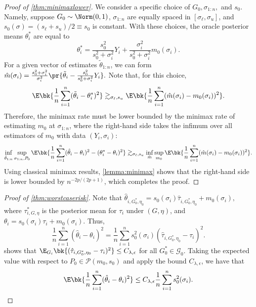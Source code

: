 \documentclass[12pt, reqno]{amsart}
\newif\ifrepeatthm
\newcommand{\sigl}{\sigma_\ell}
\newcommand{\sigu}{\sigma_u}
\newcommand{\hatm}{\hat m}
\numberwithin{equation}{section}
\begin{document}
\begin{appendices}
\begin{proof}[Proof of \cref{thm:minimaxlower}]
We consider a specific choice of $G_0, \sigma_{1:n},$ and $s_0$. Namely, suppose $G_0
\sim \Norm(0,1)$, $\sigma_{1:n}$ are equally spaced in $[\sigl, \sigu]$, and $s_0(\sigma)
= (s_\ell + s_u) / 2 \equiv s_0$ is constant.  With these choices, the oracle posterior
means $\theta_i^*$ are equal to \[
\theta_i^* = \frac{s_0^2}{s_0^2 + \sigma_i^2} Y_i + \frac{\sigma_i^2}{s_0^2 + \sigma_i^2}
m_0(\sigma_i).
\]
For a given vector of estimates $\tilde \theta_{1:n}$, we can form $
\hatm(\sigma_i) = \frac{s_0^2 + \sigma_i^2}{\sigma_i^2} \pr{\tilde \theta_i -
\frac{s_0^2}{s_0^2 + \sigma_i^2} Y_i}.$ Note that, for this choice, \[
\E\bk{\frac{1}{n} \sum_{i=1}^n (\tilde \theta_i - \theta_i^*)^2} 
\gtrsim_{\sigl, s_u} \E
\bk{\frac{1}{n} \sum_{i=1}^n (\hat m(\sigma_i) - m_0(\sigma_i))^2}.
\]
Therefore, the minimax rate must be lower bounded by the minimax rate of estimating $m_0$
at $\sigma_{1:n}$, where the right-hand side takes the infimum over all estimators of
$m_0$ with data $(Y_i, \sigma_i)$: \[
\inf_{\hat\theta_{1:n}} \sup_{\sigma_{1:n}, P_0} \E\bk{
    \frac{1}{n} \sum_{i=1}^n (\hat\theta_i - \theta_i)^2 - (\theta_i^* - \theta_i)^2
} \gtrsim_{\sigl, s_u} \inf_{\hatm} \sup_{m_0}  \E\bk{\frac{1}{n} \sum_{i=1}^n (\hat
m(\sigma_i) - m_0 (\sigma_i))^2}.
\]
Using classical minimax results, \cref{lemma:minimax} shows that the right-hand side is
lower bounded by $n^ {-2p/ (2p+1)}$, which completes the proof.
\end{proof}




\ifrepeatthm\worstcaserisk*\fi


\begin{proof}[Proof of \cref{thm:worstcaserisk}]
Note that $\hat\theta_{i, G_0^*, \eta_0} =
s_0(\sigma_i)
\hat\tau_{i, G_0^*, \eta_0} + m_0(\sigma_i),$ where $\tau^*_{i,G,\eta}$ is the posterior
mean for $\tau_i$ under $(G,\eta)$, and $
\theta_i = s_0(\sigma_i) \tau_i + m_0(\sigma_i).
$ Thus, \[
\frac{1}{n}\sum_{i=1}^n (\hat\theta_i - \theta_i)^2 = \frac{1}{n}\sum_{i=1}^n s_0^2
(\sigma_i) (\hat\tau_{i, G_0^*,
\eta_0} - \tau_i)^2.
\]
 shows that $
\E_{G_i} \bk{
  (\hat\tau_{i, G_0^*, \eta_0} - \tau_i)^2
} \le C_{\lambda, \epsilon}$ for all $G_0^* \in \mathcal G_0$.  
Taking the expected value with respect to $P_0 \in \mathcal P(m_0, s_0)$ and apply the
bound $C_{\lambda, \epsilon}$, we have that \[
\E\bk{\frac{1}{n}\sum_{i=1}^n (\hat\theta_i - \theta_i)^2} \le 
C_{\lambda, \epsilon}
\frac{1}{n}\sum_{i=1}^n s_0^2
(\sigma_i).
\]


\end{proof}
\end{appendices}
\end{document}
